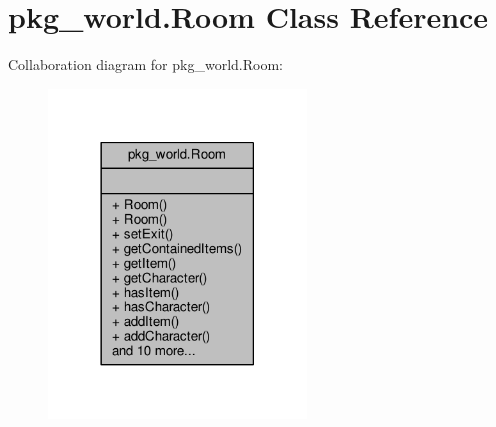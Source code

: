 \hypertarget{classpkg__world_1_1Room}{\section{pkg\-\_\-world.\-Room Class Reference}
\label{classpkg__world_1_1Room}
}


Collaboration diagram for pkg\-\_\-world.\-Room\-:
\nopagebreak
\begin{figure}[H]
\begin{center}
\leavevmode
\includegraphics[width=194pt]{classpkg__world_1_1Room__coll__graph}
\end{center}
\end{figure}
